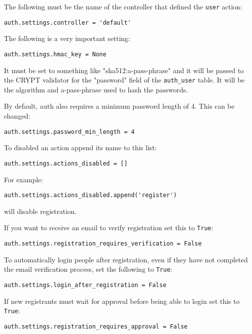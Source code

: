 \documentclass[justified,sixbynine,notoc]{tufte-book}
\def\ft{\small\tt}
\begin{document}
\begin{fullwidth}
The following must be the name of the controller that defined the {\ft user} action:

\begin{lstlisting}
auth.settings.controller = 'default'
\end{lstlisting}

The following is a very important setting:

\begin{lstlisting}
auth.settings.hmac_key = None
\end{lstlisting}

It must be set to something like "sha512:a-pass-phrase" and it will be passed to the CRYPT validator for the "password" field of the {\ft auth\_user} table. It will be the algorithm and a-pass-phrase used to hash the passwords.

By default, auth also requires a minimum password length of 4. This can be changed:
\begin{lstlisting}
auth.settings.password_min_length = 4
\end{lstlisting}

To disabled an action append its name to this list:
\begin{lstlisting}
auth.settings.actions_disabled = []
\end{lstlisting}

For example:

\begin{lstlisting}
auth.settings.actions_disabled.append('register')
\end{lstlisting}
\noindent will disable registration.

If you want to receive an email to verify registration set this to {\ft True}:

\begin{lstlisting}
auth.settings.registration_requires_verification = False
\end{lstlisting}

To automatically login people after registration, even if they have not completed the email verification process, set the following to {\ft True}:

\begin{lstlisting}
auth.settings.login_after_registration = False
\end{lstlisting}

If new registrants must wait for approval before being able to login set this to {\ft True}:

\begin{lstlisting}
auth.settings.registration_requires_approval = False
\end{lstlisting}


\end{fullwidth}
\end{document}
